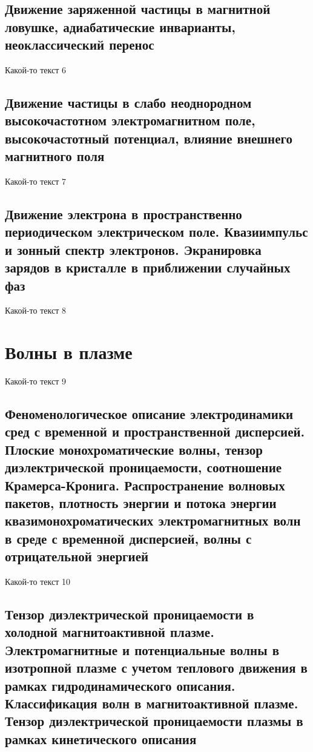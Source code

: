 \documentclass[10pt, a4paper]{article}
\let\stdsection\section
\renewcommand\section{\newpage\stdsection}
\begin{document}
\subsection{Движение заряженной частицы в магнитной ловушке, адиабатические инварианты, неоклассический перенос}

Какой-то текст 6

\subsection{Движение частицы в слабо неоднородном высокочастотном электромагнитном поле, высокочастотный потенциал, влияние внешнего магнитного поля}

Какой-то текст 7

\subsection{Движение электрона в пространственно периодическом электрическом поле. Квазиимпульс и зонный спектр электронов. Экранировка зарядов в кристалле в приближении случайных фаз}

Какой-то текст 8

\section{Волны в плазме}

Какой-то текст 9

\subsection{Феноменологическое описание электродинамики сред с временной и пространственной дисперсией. Плоские монохроматические волны, тензор диэлектрической проницаемости, 	соотношение Крамерса-Кронига. Распространение волновых пакетов, плотность энергии и потока энергии квазимонохроматических электромагнитных волн в среде с временной дисперсией, волны с отрицательной энергией}

Какой-то текст 10

\subsection{Тензор диэлектрической проницаемости в холодной магнитоактивной плазме. Электромагнитные и потенциальные волны в изотропной плазме с учетом теплового движения в рамках гидродинамического описания. Классификация волн в магнитоактивной плазме. Тензор диэлектрической проницаемости плазмы в рамках кинетического описания}
\end{document}
